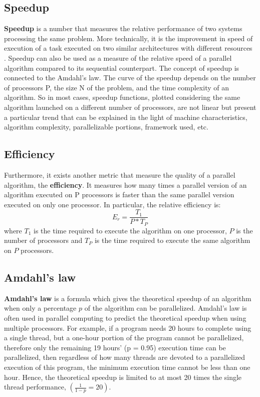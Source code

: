 \subsection{Speedup}
\textbf{Speedup} is a number that measures the relative performance of two systems processing the same problem.
More technically, it is the improvement in speed of execution of a task executed on two similar architectures with different resources \cite{wiki:Speedup}. 
Speedup can also be used as a measure of the relative speed of a parallel algorithm compared to its sequential counterpart.
The concept of speedup is connected to the Amdahl's law.
The curve of the speedup depends on the number of processors P, the size N of the problem, and the time complexity of an algorithm.
So in most cases, speedup functions, plotted considering the same algorithm launched on a different number of processors, are not linear but present a particular trend that can be explained in the light of machine characteristics, algorithm complexity, parallelizable portions, framework used, etc.

\subsection{Efficiency}
Furthermore, it exists another metric that measure the quality of a parallel algorithm, the \textbf{efficiency}. It measures how many times a parallel version of an algorithm executed on P processors is faster than the same parallel version executed on only one processor.
In particular, the relative efficiency is:
\begin{equation}
    E_r=\frac{T_1}{P*T_P} 
\end{equation}
where $T_1$ is the time required to execute the algorithm on one processor, $P$ is the number of processors and $T_P$ is the time required to execute the same algorithm on $P$ processors.

\subsection{Amdahl's law}
\textbf{Amdahl's law} is a formula which gives the theoretical speedup of an algorithm when only a percentage $p$ of the algorithm can be parallelized.
Amdahl's law is often used in parallel computing to predict the theoretical speedup when using multiple processors.
For example, if a program needs 20 hours to complete using a single thread, but a one-hour portion of the program cannot be parallelized, therefore only the remaining 19 hours' (p = 0.95) execution time can be parallelized,
then regardless of how many threads are devoted to a parallelized execution of this program, the minimum execution time cannot be less than one hour.
Hence, the theoretical speedup is limited to at most 20 times the single thread performance, $(\frac{1}{1-p}=20)$.

